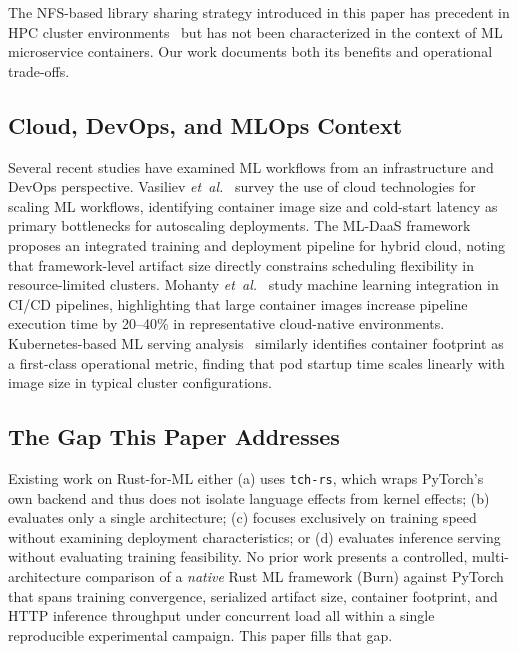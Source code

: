 \documentclass{ieeeaccess}
\begin{document}
The NFS-based library sharing strategy introduced in this paper has precedent in HPC cluster environments~\cite{buyya2009cloud} but has not been characterized in the context of ML microservice containers. Our work documents both its benefits and operational trade-offs.

\subsection{Cloud, DevOps, and MLOps Context}

Several recent studies have examined ML workflows from an infrastructure and DevOps perspective. Vasiliev \textit{et~al.}~\cite{vasiliev2024scaling} survey the use of cloud technologies for scaling ML workflows, identifying container image size and cold-start latency as primary bottlenecks for autoscaling deployments. The ML-DaaS framework~\cite{mldaas2024} proposes an integrated training and deployment pipeline for hybrid cloud, noting that framework-level artifact size directly constrains scheduling flexibility in resource-limited clusters. Mohanty \textit{et~al.}~\cite{mohanty2024cicd} study machine learning integration in CI/CD pipelines, highlighting that large container images increase pipeline execution time by 20--40\% in representative cloud-native environments. Kubernetes-based ML serving analysis~\cite{k8sml2024} similarly identifies container footprint as a first-class operational metric, finding that pod startup time scales linearly with image size in typical cluster configurations.

\subsection{The Gap This Paper Addresses}

Existing work on Rust-for-ML either (a) uses \texttt{tch-rs}, which wraps PyTorch's own backend and thus does not isolate language effects from kernel effects; (b) evaluates only a single architecture; (c) focuses exclusively on training speed without examining deployment characteristics; or (d) evaluates inference serving without evaluating training feasibility. No prior work presents a controlled, multi-architecture comparison of a \emph{native} Rust ML framework (Burn) against PyTorch that spans training convergence, serialized artifact size, container footprint, and HTTP inference throughput under concurrent load all within a single reproducible experimental campaign. This paper fills that gap.
\end{document}
